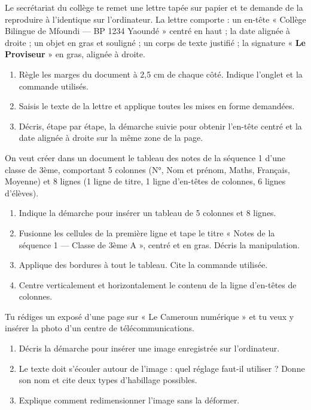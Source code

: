 \documentclass[11pt]{article}
\begin{document}
\begin{exercice}
Le secrétariat du collège te remet une lettre tapée sur papier et te demande de la reproduire à l'identique sur l'ordinateur. La lettre comporte : un en-tête « Collège Bilingue de Mfoundi — BP 1234 Yaoundé » centré en haut ; la date alignée à droite ; un objet en gras et souligné ; un corps de texte justifié ; la signature « \textbf{Le Proviseur} » en gras, alignée à droite.
\begin{enumerate}
\item Règle les marges du document à 2,5 cm de chaque côté. Indique l'onglet et la commande utilisés.
\item Saisis le texte de la lettre et applique toutes les mises en forme demandées.
\item Décris, étape par étape, la démarche suivie pour obtenir l'en-tête centré et la date alignée à droite sur la même zone de la page.
\end{enumerate}
\end{exercice}

\begin{exercice}
On veut créer dans un document le tableau des notes de la séquence 1 d'une classe de 3ème, comportant 5 colonnes (N°, Nom et prénom, Maths, Français, Moyenne) et 8 lignes (1 ligne de titre, 1 ligne d'en-têtes de colonnes, 6 lignes d'élèves).
\begin{enumerate}
\item Indique la démarche pour insérer un tableau de 5 colonnes et 8 lignes.
\item Fusionne les cellules de la première ligne et tape le titre « Notes de la séquence 1 — Classe de 3ème A », centré et en gras. Décris la manipulation.
\item Applique des bordures à tout le tableau. Cite la commande utilisée.
\item Centre verticalement et horizontalement le contenu de la ligne d'en-têtes de colonnes.
\end{enumerate}
\end{exercice}

\begin{exercice}
Tu rédiges un exposé d'une page sur « Le Cameroun numérique » et tu veux y insérer la photo d'un centre de télécommunications.
\begin{enumerate}
\item Décris la démarche pour insérer une image enregistrée sur l'ordinateur.
\item Le texte doit s'écouler autour de l'image : quel réglage faut-il utiliser ? Donne son nom et cite deux types d'habillage possibles.
\item Explique comment redimensionner l'image sans la déformer.
\end{enumerate}
\end{exercice}
\end{document}
